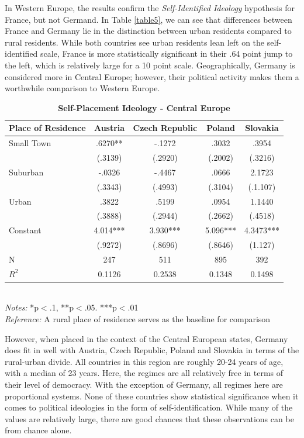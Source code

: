 \documentclass[12pt, titlepage]{article}
\newcommand\e{\emph}
\newcommand\tb{\textbf}
\begin{document}
In Western Europe, the results confirm the \e{Self-Identified Ideology} hypothesis for France, but not Germand. In Table \ref{table5}, we can see that differences between France and Germany lie in the distinction between urban residents compared to rural residents. While both countries see urban residents lean left on the self-identified scale, France is more statistically significant in their .64 point jump to the left, which is relatively large for a 10 point scale. Geographically, Germany is considered more in Central Europe; however, their political activity makes them a worthwhile comparison to Western Europe.

\begin{singlespace}
	\begin{table}[H]
		\centering
		\caption{\tb{Self-Placement Ideology - Central Europe}}
		\begin{tabulary}{\linewidth}{l c c c c}
			\\
			\hline
			\tb{Place of Residence} &\tb{Austria}&\tb{Czech Republic}& \tb{Poland} &\tb{Slovakia} \\
			\hline
			Small Town&.6270**& -.1272 & .3032 & .3954  \\
			&(.3139) & (.2920) & (.2002) & (.3216) \\
			Suburban&-.0326& -.4467&.0666 & 2.1723\\
			&(.3343)&(.4993) & (.3104) & (.1.107)\\
			Urban&.3822&.5199 & .0954 & 1.1440 \\
			&(.3888) &(.2944) & (.2662) & (.4518) \\
			Constant& 4.014***& 3.930***& 5.096*** & 4.3473***  \\
			&(.9272) & (.8696) & (.8646) & (1.127) \\
			N&247& 511& 895 & 392 \\
			$R^2$&0.1126&0.2538 & 0.1348 & 0.1498 \\
			\hline
		\end{tabulary}
		\\
		\e{Notes:} *p$<$.1, **p$<$.05. ***p$<$.01 \\
		\e{Reference:} A rural place of residence serves as the baseline for comparison
		\label{table6}
	\end{table}
\end{singlespace}

However, when placed in the context of the Central European states, Germany does fit in well with Austria, Czech Republic, Poland and Slovakia in terms of the rural-urban divide. All countries in this region are roughly 20-24 years of age, with a median of 23 years. Here, the regimes are all relatively free in terms of their level of democracy. With the exception of Germany, all regimes here are proportional systems. None of these countries show statistical significance when it comes to political ideologies in the form of self-identification. While many of the values are relatively large, there are good chances that these observations can be from chance alone. 
\end{document}
